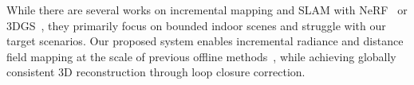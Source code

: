 While there are several works on incremental mapping and SLAM with NeRF~\cite{sucar2021iccv, ortiz2022rss, sandstrom2023iccv-pointslam} or 3DGS~\cite{matsuki2024cvpr-monogs,keetha2024cvpr-splatam,zhu2025threedv-loopsplat,wei2024ral-gsfusion}, they primarily focus on bounded indoor scenes and struggle with our target scenarios.
%
Our proposed system enables incremental radiance and distance field mapping at the scale of previous offline methods~\cite{tancik2022cvpr-blocknerf, kerbl2024tog-hierarchical3dgs}, while achieving globally consistent 3D reconstruction through loop closure correction.
%







